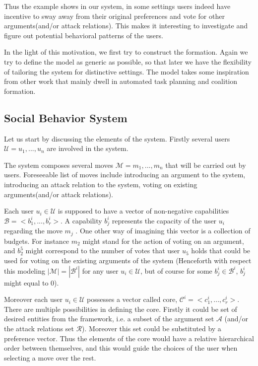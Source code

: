 \documentclass{article}
\begin{document}
Thus the example shows in our system, in some settings users indeed have incentive to sway away from their original preferences and vote for other arguments(and/or attack relations).
This makes it interesting to investigate and figure out potential behavioral patterns of the users.

In the light of this motivation, we first try to construct  the formation. Again we try to define the model as generic as possible, so that later we have the flexibility of tailoring the system for distinctive settings. The model takes some inspiration from other work that mainly dwell in automated task planning and coalition formation.%

\subsection{Social Behavior System}
Let us start by discussing the elements of the system. Firstly several users $\mathcal{U} = {u_1, ..., u_n}$ are involved in the system. 

The system composes several moves  $\mathcal{M} = {m_1, ..., m_n}$ that will be carried out by users. Foreseeable list of moves include  introducing an argument to the system, introducing an attack relation to the system, voting on existing arguments(and/or attack relations).

Each user $u_i \in \mathcal{U}$ is supposed to have a vector of non-negative capabilities $\mathcal{B} = <b_1^i, ..., b_r^i>$. A capability $b_j^i$ represents the capacity of the user $u_i$ regarding the move $m_j$ .  One other way of imagining this vector is a collection of budgets. For instance $m_2$ might stand for the action of voting on an argument, and $b_2^5$ might correspond to the number of votes that user $u_5$ holds that could be used for voting on the existing arguments of the system (Henceforth with respect this modeling $|\mathcal{M}| = |\mathcal{B}^i|$ for any user $u_i \in \mathcal{U}$, but of course for some $b_j^i \in \mathcal{B}^i$, $b_j^i$ might equal to $0$).


Moreover each user $u_i \in \mathcal{U}$ possesses a vector called core, $\mathcal{C}^i = <c_1^i, ..., c_r^i>$. There are multiple possibilities in defining the core. Firstly it could be set of desired entities from the framework, i.e. a subset of the argument set $\mathcal{A}$ (and/or the attack relations set  $\mathcal{R}$). Moreover this set could be substituted by a preference vector. Thus the elements of the core would have a relative hierarchical order between themselves, and this would guide the choices of the user when selecting a move over the rest. 
\end{document}

